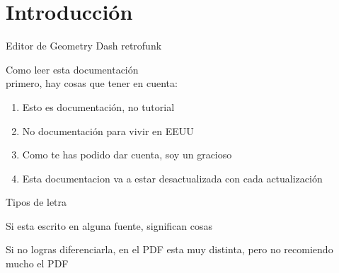 \chapter{Introducción}

\Huge{Editor de Geometry Dash retrofunk}

\Huge{Como leer esta documentación} \\
\Large{primero, hay cosas que tener en cuenta:}
\begin{enumerate}  
\item Esto es documentación, no tutorial 
\item No documentación para vivir en EEUU
\item Como te has podido dar cuenta, soy un gracioso
\item Esta documentacion va a estar desactualizada con cada actualización
\end{enumerate}

\large{Tipos de letra}

Si esta escrito en alguna fuente, significan cosas

Si no logras diferenciarla, en el PDF esta muy distinta, pero no recomiendo mucho el PDF
